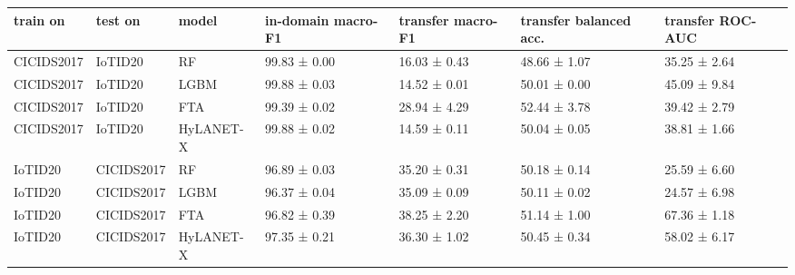 \begin{tabular}{lllllll}
\toprule
train on & test on & model & in-domain macro-F1 & transfer macro-F1 & transfer balanced acc. & transfer ROC-AUC \\
\midrule
CICIDS2017 & IoTID20 & RF & 99.83 ± 0.00 & 16.03 ± 0.43 & 48.66 ± 1.07 & 35.25 ± 2.64 \\
CICIDS2017 & IoTID20 & LGBM & 99.88 ± 0.03 & 14.52 ± 0.01 & 50.01 ± 0.00 & 45.09 ± 9.84 \\
CICIDS2017 & IoTID20 & FTA & 99.39 ± 0.02 & 28.94 ± 4.29 & 52.44 ± 3.78 & 39.42 ± 2.79 \\
CICIDS2017 & IoTID20 & HyLANET-X & 99.88 ± 0.02 & 14.59 ± 0.11 & 50.04 ± 0.05 & 38.81 ± 1.66 \\
IoTID20 & CICIDS2017 & RF & 96.89 ± 0.03 & 35.20 ± 0.31 & 50.18 ± 0.14 & 25.59 ± 6.60 \\
IoTID20 & CICIDS2017 & LGBM & 96.37 ± 0.04 & 35.09 ± 0.09 & 50.11 ± 0.02 & 24.57 ± 6.98 \\
IoTID20 & CICIDS2017 & FTA & 96.82 ± 0.39 & 38.25 ± 2.20 & 51.14 ± 1.00 & 67.36 ± 1.18 \\
IoTID20 & CICIDS2017 & HyLANET-X & 97.35 ± 0.21 & 36.30 ± 1.02 & 50.45 ± 0.34 & 58.02 ± 6.17 \\
\bottomrule
\end{tabular}
